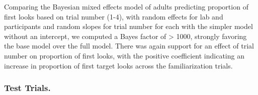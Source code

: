 \documentclass[
  english,
  man,floatsintext]{apa6}
\begin{document}
Comparing the Bayesian mixed effects model of adults predicting proportion of first looks based on trial number (1-4), with random effects for lab and participants and random slopes for trial number for each with the simpler model without an intercept, we computed a Bayes factor of \textgreater{} 1000, strongly favoring the base model over the full model.
There was again support for an effect of trial number on proportion of first looks, with the positive coefficient indicating an increase in proportion of first target looks across the familiarization trials.

\hypertarget{test-trials.}{%
\subsubsection{Test Trials.}\label{test-trials.}}
\end{document}
